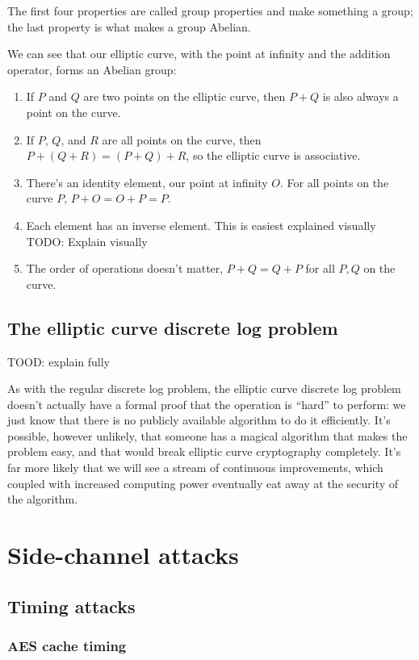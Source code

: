 \documentclass[11pt,ebook,table,dvipsnames]{memoir}
\begin{document}
The first four properties are called group properties and make
something a group; the last property is what makes a group Abelian.

We can see that our elliptic curve, with the point at infinity and the
addition operator, forms an Abelian group:

\begin{enumerate}
\item If $P$ and $Q$ are two points on the elliptic curve, then $P + Q$
   is also always a point on the curve.
\item If $P$, $Q$, and $R$ are all points on the curve, then $P + (Q + R)
   = (P + Q) + R$, so the elliptic curve is associative.
\item There's an identity element, our point at infinity $O$. For all
points on the curve $P$, $P + O = O + P = P$.
\item Each element has an inverse element. This is easiest explained
visually TODO: Explain visually
\item The order of operations doesn't matter, $P + Q = Q + P$ for all $P,
   Q$ on the curve.
\end{enumerate}

\section{The elliptic curve discrete log problem}
\label{sec-4-2-1}

TOOD: explain fully

As with the regular discrete log problem, the elliptic curve discrete
log problem doesn't actually have a formal proof that the operation is
\enquote{hard} to perform: we just know that there is no publicly available
algorithm to do it efficiently. It's possible, however unlikely, that
someone has a magical algorithm that makes the problem easy, and that
would break elliptic curve cryptography completely. It's far more
likely that we will see a stream of continuous improvements, which
coupled with increased computing power eventually eat away at the
security of the algorithm.
\chapter{Side-channel attacks}
\label{sec-4-3}
\section{Timing attacks}
\label{sec-4-3-1}
\subsection{AES cache timing}
\label{sec-4-3-1-1}
\end{document}
